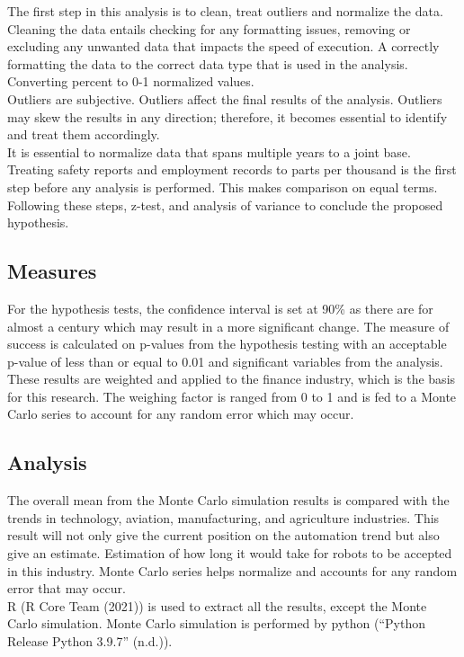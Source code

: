 \documentclass[
  english,
  man]{apa7}
\begin{document}
The first step in this analysis is to clean, treat outliers and normalize the data. Cleaning the data entails checking for any formatting issues, removing or excluding any unwanted data that impacts the speed of execution. A correctly formatting the data to the correct data type that is used in the analysis. Converting percent to 0-1 normalized values.\\
Outliers are subjective. Outliers affect the final results of the analysis. Outliers may skew the results in any direction; therefore, it becomes essential to identify and treat them accordingly.\\
It is essential to normalize data that spans multiple years to a joint base. Treating safety reports and employment records to parts per thousand is the first step before any analysis is performed. This makes comparison on equal terms.\\
Following these steps, z-test, and analysis of variance to conclude the proposed hypothesis.\\

\hypertarget{measures}{%
\subsection{Measures}\label{measures}}

For the hypothesis tests, the confidence interval is set at 90\% as there are for almost a century which may result in a more significant change. The measure of success is calculated on p-values from the hypothesis testing with an acceptable p-value of less than or equal to 0.01 and significant variables from the analysis.\\
These results are weighted and applied to the finance industry, which is the basis for this research. The weighing factor is ranged from 0 to 1 and is fed to a Monte Carlo series to account for any random error which may occur.

\hypertarget{analysis}{%
\subsection{Analysis}\label{analysis}}

The overall mean from the Monte Carlo simulation results is compared with the trends in technology, aviation, manufacturing, and agriculture industries. This result will not only give the current position on the automation trend but also give an estimate. Estimation of how long it would take for robots to be accepted in this industry. Monte Carlo series helps normalize and accounts for any random error that may occur.\\
R (R Core Team (2021)) is used to extract all the results, except the Monte Carlo simulation. Monte Carlo simulation is performed by python ({``Python Release Python 3.9.7''} (n.d.)).
\end{document}
